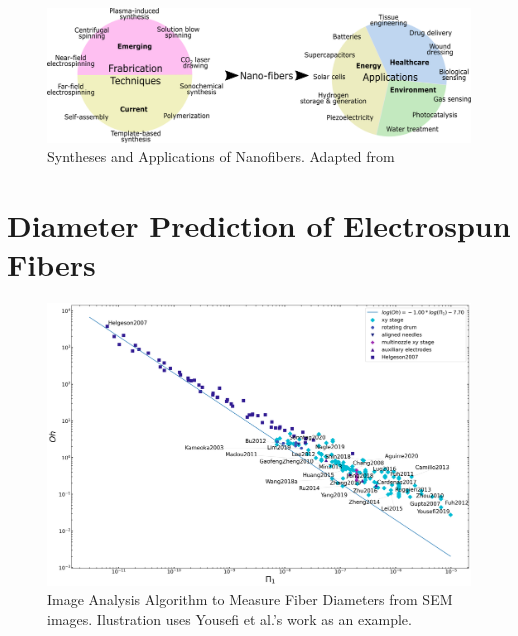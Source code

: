 \begin{figure}[!th]
\centering
\includegraphics[width=\textwidth]{./Figures/synthesesAndApplicationsOfNanofibers.png}
\decoRule
\caption[Syntheses and Applications of Nanofibers]{Syntheses and Applications of Nanofibers. Adapted from \cite{Kenry2017}}
\label{fig:synthesesAndApplicationsOfNanofibers}
\end{figure}

\section{Diameter Prediction of Electrospun Fibers} %



\begin{figure}[!th]
\centering
\includegraphics[width=\textwidth]{./Figures/plt_Pi1_vs_Oh.png}
\decoRule
\caption[Image Analysis Algorithm to Measure Fiber Diameters from SEM images]{Image Analysis Algorithm to Measure Fiber Diameters from SEM images. Ilustration uses Yousefi et al.'s work as an example. \cite{Helgeson2007,
  Yang2019,Fattahi2017,Shin2019,Wang2015,Parajuli2016,Zheng2010,Fuh2011,Dalton2015,
  Ru2014,Xue2014,Wang2017,Xu2014,Liu2013,Pan2014,Canton2014,Chakraborty2009,Gupta2007,
  He2018,Zhou2011,Chen2013,Williams2018,Choi2017,Pan2019,Lei2015,Lim2019,Park2020,
  Fuh2012,Flores2017,Chang2010,Xu2019,Zhang2019,Shin2018,Fuh2015,Nagle2019,Zheng2012,
  Kameoka2003a,Liu2014,E.King2019,Hochleitner2017,Madou2011,Jiang2018,Husain2016,
  ElectrospinTech2015,Brown2011,Kolan2018,Chang2011,Beachley2011,Camillo2013,Kameoka2003,
  Bu2012,Lee2012,Huang2015,Coppola2020,CisquellaSerra2019,Ruggieri2013,Hochleitner2014,
  Zhu2016,Brown2014,Chang2008,Sonntag2020,Kim2018,Deng2020,Han2019,George2020,Sun2006a,
  Pan2015,Shen2016,Strauss2019,Fuh2013,Sarkar2007,You2017,Wang2018a,Zheng2014,Song2015,
  GaofengZheng2010,Liu2015a,Min2013,Luo2016,Yousefi2019,Cardenas2017,Coppola2014}}
\label{fig:plt_Pi1_vs_Oh}
\end{figure}